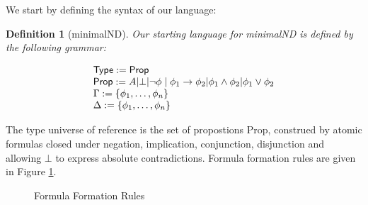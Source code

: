 \documentclass[]{article}
\newtheorem{definition}{Definition}
\begin{document}
We start by defining the syntax of our language:

\begin{definition}[{\sf minimalND}]

 Our starting language for {\sf minimalND} is defined by the following grammar:
 
\begin{displaymath}
\begin{array}{l}
{\sf Type}:={\sf Prop}\\
{\sf Prop}:= A | \bot | \neg \phi \mid \phi_{1} \rightarrow \phi_{2} | \phi_{1} \wedge \phi_{2} | \phi_{1} \vee \phi_{2}\\
\Gamma := \{\phi_{1}, \dots, \phi_{n}\}\\
\Delta := \{\phi_{1}, \dots, \phi_{n}\}

\end{array}
\end{displaymath}
\end{definition}

%
The type universe of reference is the set of propostions {\sf Prop}, construed by atomic formulas closed under negation, implication, conjunction, disjunction and allowing $\bot$ to express absolute contradictions. Formula formation rules are given in Figure \ref{fig:formulaconstructions}. 

\begin{figure}[h!]
\caption{Formula Formation Rules}\label{fig:formulaconstructions}
\end{figure}
\end{document}
